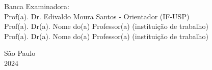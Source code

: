 \begin{titlepage}

\noindent Banca Examinadora: \\
\noindent Prof(a). Dr. Edivaldo Moura Santos - Orientador (IF-USP) \\
Prof(a). Dr(a). Nome do(a) Professor(a) (institui\c{c}\~{a}o de trabalho) \\
Prof(a). Dr(a). Nome do(a) Professor(a) (institui\c{c}\~{a}o de trabalho) \\
\vspace{2.8cm}


\centering
    {São Paulo \\  2024}
\clearpage
\end{titlepage}

